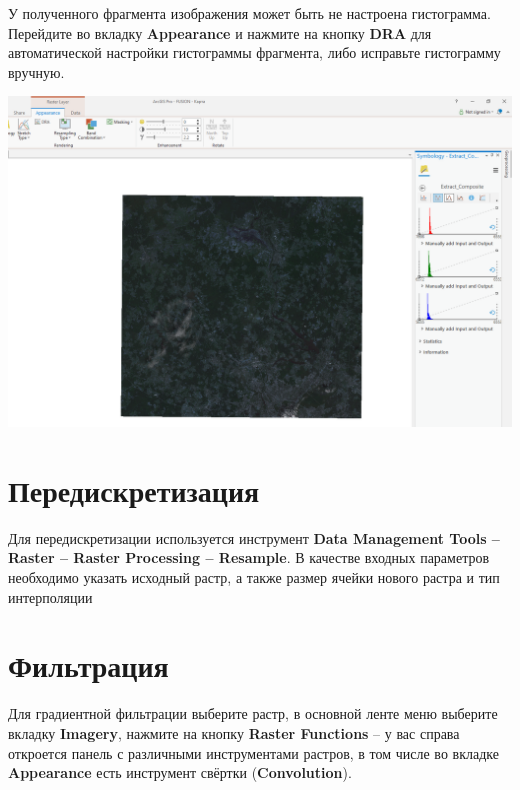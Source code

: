 \documentclass[
  12pt,
]{book}
\begin{document}
У полученного фрагмента изображения может быть не настроена гистограмма. Перейдите во вкладку \textbf{Appearance} и нажмите на кнопку \textbf{DRA} для автоматической настройки гистограммы фрагмента, либо исправьте гистограмму вручную.

\includegraphics{images/Ref01/Stretching.png}

\hypertarget{pansharpen-resampling}{%
\section{Передискретизация}\label{pansharpen-resampling}}

Для передискретизации используется инструмент \textbf{Data Management Tools -- Raster -- Raster Processing -- Resample}. В качестве входных параметров необходимо указать исходный растр, а также размер ячейки нового растра и тип интерполяции

\hypertarget{pansharpen-filter}{%
\section{Фильтрация}\label{pansharpen-filter}}

Для градиентной фильтрации выберите растр, в основной ленте меню выберите вкладку \textbf{Imagery}, нажмите на кнопку \textbf{Raster Functions} -- у вас справа откроется панель с различными инструментами растров, в том числе во вкладке \textbf{Appearance} есть инструмент свёртки (\textbf{Convolution}).
\end{document}
